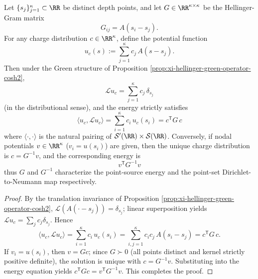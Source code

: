 \begin{proposition}\label{prop:xi-hellinger-charge-potential-duality-dtn}
Let \(\{s_j\}_{j=1}^\kappa\subset\RR\) be distinct depth points, and let \(G\in\RR^{\kappa\times\kappa}\) be the Hellinger-Gram matrix
\[
G_{ij}=A(s_i-s_j).
\]
For any charge distribution \(c\in\RR^\kappa\), define the potential function
\[
u_c(s):=\sum_{j=1}^{\kappa}c_j\,A(s-s_j).
\]
Then under the Green structure of Proposition \ref{prop:xi-hellinger-green-operator-cosh2},
\[
\mathcal L u_c=\sum_{j=1}^{\kappa}c_j\,\delta_{s_j}
\]
(in the distributional sense), and the energy strictly satisfies
\[
\boxed{\;
\langle u_c,\mathcal L u_c\rangle
=\sum_{i=1}^{\kappa}c_i\,u_c(s_i)
=c^{\mathsf T}G\,c\;}
\]
where \(\langle\cdot,\cdot\rangle\) is the natural pairing of \(\mathcal S'(\RR)\times\mathcal S(\RR)\).
Conversely, if nodal potentials \(v\in\RR^\kappa\) (\(v_i=u(s_i)\)) are given, then the unique charge distribution is \(c=G^{-1}v\), and the corresponding energy is
\[
\boxed{\;v^{\mathsf T}G^{-1}v\;}
\]
thus \(G\) and \(G^{-1}\) characterize the point-source energy and the point-set Dirichlet-to-Neumann map respectively.
\end{proposition}
\begin{proof}
By the translation invariance of Proposition \ref{prop:xi-hellinger-green-operator-cosh2}, \(\mathcal L(A(\cdot-s_j))=\delta_{s_j}\); linear superposition yields \(\mathcal L u_c=\sum_j c_j\delta_{s_j}\).
Hence
\[
\langle u_c,\mathcal L u_c\rangle
=\sum_{i=1}^{\kappa}c_i\,u_c(s_i)
=\sum_{i,j=1}^{\kappa}c_i c_j\,A(s_i-s_j)
=c^{\mathsf T}G\,c.
\]
If \(v_i=u(s_i)\), then \(v=Gc\); since \(G\succ0\) (all points distinct and kernel strictly positive definite), the solution is unique with \(c=G^{-1}v\).
Substituting into the energy equation yields \(c^{\mathsf T}G c=v^{\mathsf T}G^{-1}v\). This completes the proof.
\end{proof}
